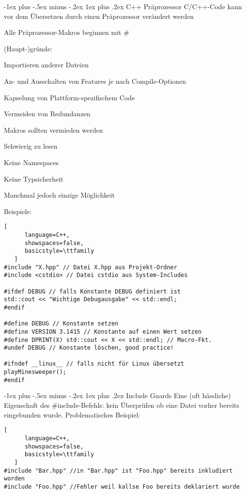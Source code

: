 \documentclass[10pt]{article}
\makeatletter
\renewcommand{\subsubsection}{\@startsection{subsubsection}{3}{0mm}%
                                {-1ex plus -.5ex minus -.2ex}%
                                {1ex plus .2ex}%
                                {\normalfont\small\bfseries}}
\makeatother
\begin{document}
\begin{itemize*}
\subsubsection{C++ Präprozessor}
C/C++-Code kann vor dem Übersetzen durch einen Präprozessor verändert werden
\begin{itemize*}
  \item Alle Präprozessor-Makros beginnen mit \#
  \item (Haupt-)gründe:
  \begin{itemize*}
    \item Importieren anderer Dateien
    \item An- und Ausschalten von Features je nach Compile-Optionen
    \item Kapselung von Plattform-spezifischem Code
    \item Vermeiden von Redundanzen
  \end{itemize*}
  \item Makros sollten vermieden werden
  \begin{itemize*}
    \item Schwierig zu lesen
    \item Keine Namespaces
    \item Keine Typsicherheit
  \end{itemize*}
  \item Manchmal jedoch einzige Möglichkeit
\end{itemize*}

Beispiele: 
\begin{lstlisting}[
      language=C++,
      showspaces=false,
      basicstyle=\ttfamily
   ]
#include "X.hpp" // Datei X.hpp aus Projekt-Ordner
#include <cstdio> // Datei cstdio aus System-Includes

#ifdef DEBUG // falls Konstante DEBUG definiert ist
std::cout << "Wichtige Debugausgabe" << std::endl;
#endif

#define DEBUG // Konstante setzen
#define VERSION 3.1415 // Konstante auf einen Wert setzen
#define DPRINT(X) std::cout << X << std::endl; // Macro-Fkt.
#undef DEBUG // Konstante löschen, good practice!

#ifndef __linux__ // falls nicht für Linux übersetzt
playMinesweeper();
#endif
\end{lstlisting}


\subsubsection{Include Guards}
Eine (oft hässliche) Eigenschaft des \#include-Befehls: kein Überprüfen ob eine Datei vorher bereits eingebunden wurde. Problematisches Beispiel:
\begin{lstlisting}[
      language=C++,
      showspaces=false,
      basicstyle=\ttfamily
   ]
#include "Bar.hpp" //in "Bar.hpp" ist "Foo.hpp" bereits inkludiert worden
#include "Foo.hpp" //Fehler weil kallse Foo bereits deklariert wurde
\end{lstlisting}


\end{itemize*}
\end{document}
